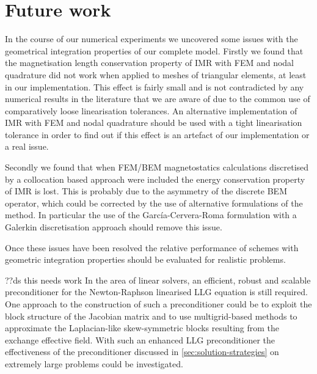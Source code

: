 \section{Future work}


In the course of our numerical experiments we uncovered some issues with the geometrical integration properties of our complete model.
Firstly we found that the magnetisation length conservation property of IMR with FEM and nodal quadrature did not work when applied to meshes of triangular elements, at least in our implementation.
This effect is fairly small and is not contradicted by any numerical results in the literature that we are aware of due to the common use of comparatively loose linearisation tolerances.
An alternative implementation of IMR with FEM and nodal quadrature should be used with a tight linearisation tolerance in order to find out if this effect is an artefact of our implementation or a real issue.

Secondly we found that when FEM/BEM magnetostatics calculations discretised by a collocation based approach were included the energy conservation property of IMR is lost.
This is probably due to the asymmetry of the discrete BEM operator, which could be corrected by the use of alternative formulations of the method.
In particular the use of the Garc\'{i}a-Cervera-Roma formulation \cite{Garcia-Cervera2006} with a Galerkin discretisation approach \cite[75]{Wrobel2002} should remove this issue.

Once these issues have been resolved the relative performance of schemes with geometric integration properties should be evaluated for realistic problems.


??ds this needs work
In the area of linear solvers, an efficient, robust and scalable preconditioner for the Newton-Raphson linearised LLG equation is still required.
One approach to the construction of such a preconditioner could be to exploit the block structure of the Jacobian matrix and to use multigrid-based methods to approximate the Laplacian-like skew-symmetric blocks resulting from the exchange effective field.
With such an enhanced LLG preconditioner the effectiveness of the preconditioner discussed in \cref{sec:solution-strategies} on extremely large problems could be investigated.



